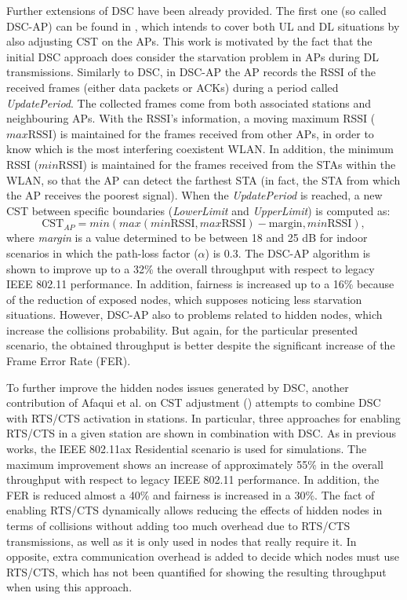 \documentclass[12pt, a4paper,twoside]{tesi_upf}
\begin{document}
				Further extensions of DSC have been already provided. The first one (so called DSC-AP) can be found in \cite{afaqui2016dynamic}, which intends to cover both UL and DL situations by also adjusting CST on the APs. This work is motivated by the fact that the initial DSC approach does consider the starvation problem in APs during DL transmissions. Similarly to DSC, in DSC-AP the AP records the RSSI of the received frames (either data packets or ACKs) during a period called \textit{UpdatePeriod}. The collected frames come from both associated stations and neighbouring APs. With the RSSI's information, a moving maximum RSSI ($max\mathrm{RSSI}$) is maintained for the frames received from other APs, in order to know which is the most interfering coexistent WLAN. In addition, the minimum RSSI ($min\mathrm{RSSI}$) is maintained for the frames received from the STAs within the WLAN, so that the AP can detect the farthest STA (in fact, the STA from which the AP receives the poorest signal). When the \textit{UpdatePeriod} is reached, a new CST between specific boundaries (\textit{LowerLimit} and \textit{UpperLimit}) is computed as:
				\begin{equation}
					\mathrm{CST}_{AP} = min(max(min\mathrm{RSSI}, max\mathrm{RSSI})- \text{margin}, min\mathrm{RSSI}),
					\nonumber
				\end{equation}
				where \textit{margin} is a value determined to be between 18 and 25 dB for indoor scenarios in which the path-loss factor ($\alpha$) is 0.3. The DSC-AP algorithm is shown to improve up to a 32\% the overall throughput with respect to legacy IEEE 802.11 performance. In addition, fairness is increased up to a 16\% because of the reduction of exposed nodes, which supposes noticing less starvation situations. However, DSC-AP also to problems related to hidden nodes, which increase the collisions probability. But again, for the particular presented scenario, the obtained throughput is better despite the significant increase of the Frame Error Rate (FER). 
				
				To further improve the hidden nodes issues generated by DSC, another contribution of Afaqui et al. on CST adjustment (\cite{afaqui2016rtscts}) attempts to combine DSC with RTS/CTS activation in stations. In particular, three approaches for enabling RTS/CTS in a given station are shown in combination with DSC. As in previous works, the IEEE 802.11ax Residential scenario is used for simulations. The maximum improvement shows an increase of approximately 55\% in the overall throughput with respect to legacy IEEE 802.11 performance. In addition, the FER is reduced almost a 40\% and fairness is increased in a 30\%. The fact of enabling RTS/CTS dynamically allows reducing the effects of hidden nodes in terms of collisions without adding too much overhead due to RTS/CTS transmissions, as well as it is only used in nodes that really require it. In opposite, extra communication overhead is added to decide which nodes must use RTS/CTS, which has not been quantified for showing the resulting throughput when using this approach.	
					
\end{document}
